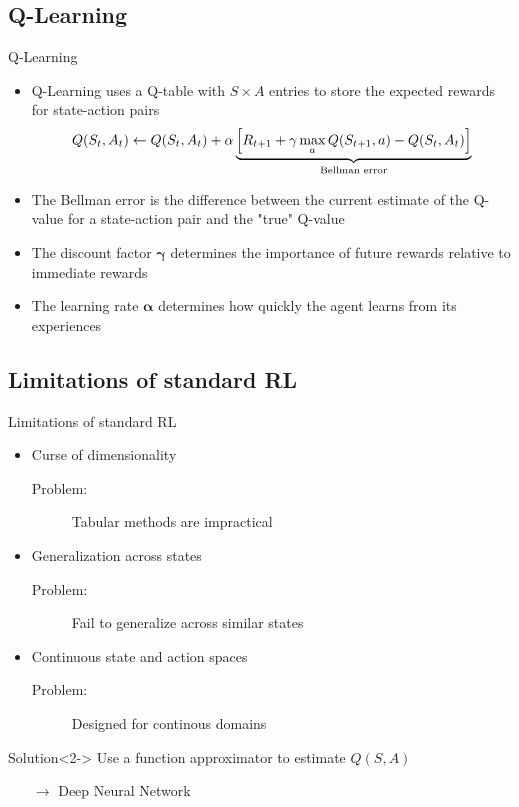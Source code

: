 \documentclass[xcolor=dvipsnames]{beamer}
\begin{document}
\subsection{Q-Learning}
\begin{frame}{Q-Learning}
    \begin{itemize}
        \item \alert{Q-Learning} uses a Q-table with $S \times A$ entries to store the expected rewards for state-action pairs
        \begin{equation*}
            Q(S_t, A_t) \leftarrow Q(S_t, A_t) + \alpha \underbrace{\Bigl[R_{t+1} + \gamma \max_a Q(S_{t+1}, a) - Q(S_t, A_t)\Bigr]}_\text{Bellman error}
        \end{equation*}
        \item The \alert{Bellman error} is the difference between the current estimate of the Q-value for a state-action pair and the "true" Q-value
        \item The discount factor $\boldsymbol{\gamma}$ determines the importance of future rewards relative to immediate rewards
        \item The learning rate $\boldsymbol{\alpha}$ determines how quickly the agent learns from its experiences
    \end{itemize}
\end{frame}


\subsection{Limitations of standard RL}
\begin{frame}{Limitations of standard RL}
    \begin{itemize}
        \item Curse of dimensionality
        \begin{description}
            \item[Problem:] Tabular methods are impractical
        \end{description}
        \item Generalization across states
        \begin{description}
            \item[Problem:] Fail to generalize across similar states
        \end{description}
        \item Continuous state and action spaces
        \begin{description}
            \item[Problem:] Designed for continous domains
        \end{description}
    \end{itemize}
    \begin{block}{Solution}<2->
        Use a function approximator to estimate $Q(S,A)$
        \begin{itemize}
            \item[$\boldsymbol{\rightarrow}$] Deep Neural Network
        \end{itemize}
    \end{block}
\end{frame}
\end{document}
